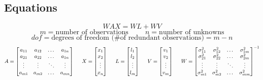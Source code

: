 \subsection{Equations}
\[
WAX=WL+WV 
\]
\[
m = \text{number of observations} \hspace{1cm} 
n = \text{number of unknowns}
\]
\[
dof = \text{degrees of freedom (\# of redundant observations)} = m-n
\]
\[
A = \begin{bmatrix}
a_{11} & a_{12} & \dots & a_{1n} \\
a_{21} & a_{22} & \dots & a_{1n} \\
\vdots & \vdots & \ddots& \vdots \\
a_{m1} & a_{m2} & \dots & a_{mn} \\
\end{bmatrix}
\hspace{0.5cm}
X = 
\begin{bmatrix}
x_1 \\ x_2 \\ \vdots \\ x_n
\end{bmatrix}
\hspace{0.5cm}
L = 
\begin{bmatrix}
l_1 \\ l_2 \\ \vdots \\ l_m
\end{bmatrix}
\hspace{0.5cm}
V = 
\begin{bmatrix}
v_1 \\ v_2 \\ \vdots \\ v_m
\end{bmatrix}
\hspace{0.5cm}
W = 
\begin{bmatrix}
\sigma_{11}^2 & \sigma_{12}^2 & \dots & \sigma_{1m}^2 \\ 
\sigma_{21}^2 & \sigma_{22}^2 & \dots & \sigma_{2m}^2 \\ 
\vdots & \vdots & \ddots& \vdots \\
\sigma_{m1}^2 & \sigma_{m2}^2 & \dots & \sigma_{mm}^2 \\ 
\end{bmatrix}
^{-1}
\]

